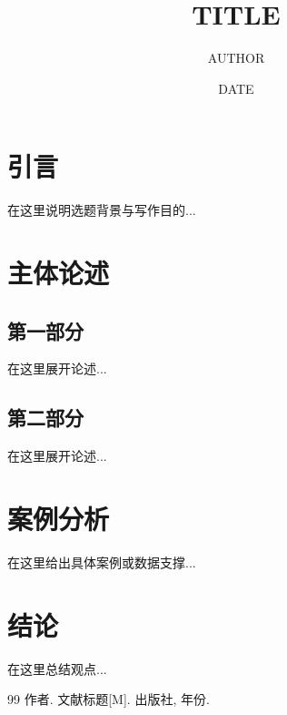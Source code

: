 \documentclass[12pt,a4paper]{article}
\title{{{TITLE}}}
\author{{{AUTHOR}}}
\date{{{DATE}}}
\begin{document}
\maketitle

\section{引言}
在这里说明选题背景与写作目的...

\section{主体论述}

\subsection{第一部分}
在这里展开论述...

\subsection{第二部分}
在这里展开论述...

\section{案例分析}
在这里给出具体案例或数据支撑...

\section{结论}
在这里总结观点...

\begin{thebibliography}{99}
 作者. 文献标题[M]. 出版社, 年份.
\end{thebibliography}
\end{document}
